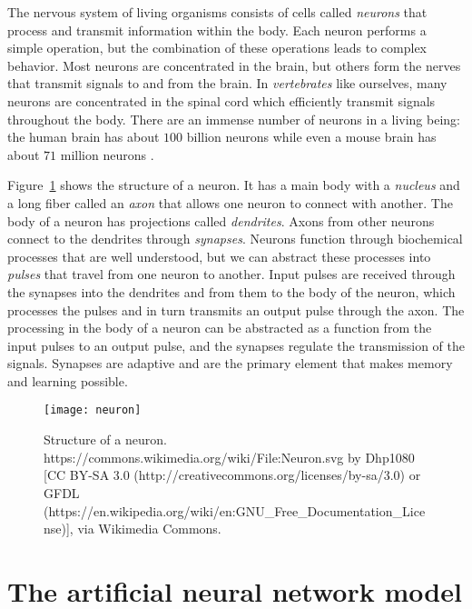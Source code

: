 The nervous system of living organisms consists of cells called \emph{neurons} that process and transmit information within the body. Each neuron performs a simple operation, but the combination of these operations leads to complex behavior. Most neurons are concentrated in the brain, but others form the nerves that transmit signals to and from the brain. In \emph{vertebrates} like ourselves, many neurons are concentrated in the spinal cord which efficiently transmit signals throughout the body. There are an immense number of neurons in a living being: the human brain has about $100$ billion neurons while even a mouse brain has about $71$ million neurons \cite{herculano2009human}. 

Figure~\ref{fig.neuron} shows the structure of a neuron. It has a main body with a \emph{nucleus} and a long fiber called an \emph{axon} that allows one neuron to connect with another. The body of a neuron has projections called \emph{dendrites}. Axons from other neurons connect to the dendrites through \emph{synapses}. Neurons function through biochemical processes that are well understood, but we can abstract these processes into \emph{pulses} that travel from one neuron to another. Input pulses are received through the synapses into the dendrites and from them to the body of the neuron, which processes the pulses and in turn transmits an output pulse through the axon. The processing in the body of a neuron can be abstracted as a function from the input pulses to an output pulse, and the synapses regulate the transmission of the signals. Synapses are adaptive and are the primary element that makes memory and learning possible.

\begin{figure}
\begin{center}
\texttt{[image: neuron]}
\end{center}
\caption{Structure of a neuron. https://commons.wikimedia.org/wiki/File:Neuron.svg by Dhp1080 [CC BY-SA 3.0 (http://creativecommons.org/licenses/by-sa/3.0) or GFDL (https://en.wikipedia.org/wiki/en:GNU\_Free\_Documentation\_License)], via Wikimedia Commons.
}\label{fig.neuron}
\end{figure}

\section{The artificial neural network model}\label{s.ann}

